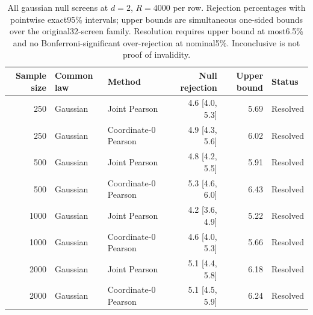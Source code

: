 \begin{table}[t]
\centering
\scriptsize
\caption{All gaussian null screens at $d=2$, $R=4000$ per row. Rejection percentages with pointwise exact95\% intervals; upper bounds are simultaneous one-sided bounds over the original32-screen family. Resolution requires upper bound at most6.5\% and no Bonferroni-significant over-rejection at nominal5\%. Inconclusive is not proof of invalidity.}
\label{tab:dependence-null-gaussian-2}
{\setlength{\tabcolsep}{8pt}\renewcommand{\arraystretch}{1.2}
\begin{tabular}{rllrrl}
\toprule
Sample size & Common law & Method & Null rejection & Upper bound & Status\\
\midrule
250 & Gaussian & Joint Pearson & 4.6 [4.0, 5.3] & 5.69 & Resolved\\
250 & Gaussian & Coordinate-0 Pearson & 4.9 [4.3, 5.6] & 6.02 & Resolved\\
500 & Gaussian & Joint Pearson & 4.8 [4.2, 5.5] & 5.91 & Resolved\\
500 & Gaussian & Coordinate-0 Pearson & 5.3 [4.6, 6.0] & 6.43 & Resolved\\
1000 & Gaussian & Joint Pearson & 4.2 [3.6, 4.9] & 5.22 & Resolved\\
1000 & Gaussian & Coordinate-0 Pearson & 4.6 [4.0, 5.3] & 5.66 & Resolved\\
2000 & Gaussian & Joint Pearson & 5.1 [4.4, 5.8] & 6.18 & Resolved\\
2000 & Gaussian & Coordinate-0 Pearson & 5.1 [4.5, 5.9] & 6.24 & Resolved\\
\bottomrule
\end{tabular}}
\end{table}

